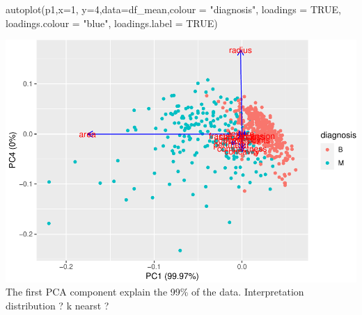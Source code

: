 \documentclass[
  11pt,
]{article}
\newenvironment{Shaded}{\begin{snugshade}}{\end{snugshade}}
\newcommand{\AttributeTok}[1]{\textcolor[rgb]{0.77,0.63,0.00}{#1}}
\newcommand{\ConstantTok}[1]{\textcolor[rgb]{0.00,0.00,0.00}{#1}}
\newcommand{\DecValTok}[1]{\textcolor[rgb]{0.00,0.00,0.81}{#1}}
\newcommand{\FunctionTok}[1]{\textcolor[rgb]{0.00,0.00,0.00}{#1}}
\newcommand{\NormalTok}[1]{#1}
\newcommand{\OtherTok}[1]{\textcolor[rgb]{0.56,0.35,0.01}{#1}}
\newcommand{\SpecialCharTok}[1]{\textcolor[rgb]{0.00,0.00,0.00}{#1}}
\newcommand{\StringTok}[1]{\textcolor[rgb]{0.31,0.60,0.02}{#1}}
\begin{document}
\begin{Shaded}
\begin{Highlighting}[]
\FunctionTok{autoplot}\NormalTok{(p1,}\AttributeTok{x=}\DecValTok{1}\NormalTok{, }\AttributeTok{y=}\DecValTok{4}\NormalTok{,}\AttributeTok{data=}\NormalTok{df\_mean,}\AttributeTok{colour =} \StringTok{"diagnosis"}\NormalTok{, }\AttributeTok{loadings =} \ConstantTok{TRUE}\NormalTok{, }\AttributeTok{loadings.colour =} \StringTok{"blue"}\NormalTok{,}
         \AttributeTok{loadings.label =} \ConstantTok{TRUE}\NormalTok{)}
\end{Highlighting}
\end{Shaded}

\includegraphics{stat_DAP_files/figure-latex/unnamed-chunk-18-1.pdf} The
first PCA component explain the 99\% of the data. Interpretation
distribution ? k nearst ?

\begin{Shaded}
\end{Shaded}
\end{document}
